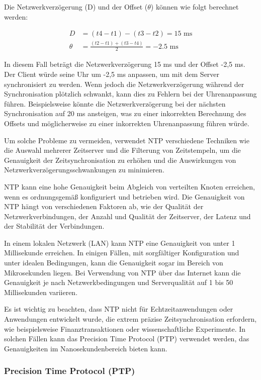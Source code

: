 Die Netzwerkverzögerung (D) und der Offset (\(\theta\)) können wie folgt berechnet werden:

\begin{align*}
D &= (t4 - t1) - (t3 - t2) = 15 \text{ ms} \\
\theta &= \frac{(t2 - t1) + (t3 - t4)}{2} = -2.5 \text{ ms}
\end{align*}

In diesem Fall beträgt die Netzwerkverzögerung 15 ms und der Offset -2,5 ms. Der Client würde seine Uhr um -2,5 ms anpassen, um mit dem Server synchronisiert zu werden. Wenn jedoch die Netzwerkverzögerung während der Synchronisation plötzlich schwankt, kann dies zu Fehlern bei der Uhrenanpassung führen. Beispielsweise könnte die Netzwerkverzögerung bei der nächsten Synchronisation auf 20 ms ansteigen, was zu einer inkorrekten Berechnung des Offsets und möglicherweise zu einer inkorrekten Uhrenanpassung führen würde.

Um solche Probleme zu vermeiden, verwendet NTP verschiedene Techniken wie die Auswahl mehrerer Zeitserver und die Filterung von Zeitstempeln, um die Genauigkeit der Zeitsynchronisation zu erhöhen und die Auswirkungen von Netzwerkverzögerungsschwankungen zu minimieren.

NTP kann eine hohe Genauigkeit beim Abgleich von verteilten Knoten erreichen, wenn es ordnungsgemäß konfiguriert und betrieben wird. Die Genauigkeit von NTP hängt von verschiedenen Faktoren ab, wie der Qualität der Netzwerkverbindungen, der Anzahl und Qualität der Zeitserver, der Latenz und der Stabilität der Verbindungen.

In einem lokalen Netzwerk (LAN) kann NTP eine Genauigkeit von unter 1 Millisekunde erreichen. In einigen Fällen, mit sorgfältiger Konfiguration und unter idealen Bedingungen, kann die Genauigkeit sogar im Bereich von Mikrosekunden liegen. Bei Verwendung von NTP über das Internet kann die Genauigkeit je nach Netzwerkbedingungen und Serverqualität auf 1 bis 50 Millisekunden variieren.

Es ist wichtig zu beachten, dass NTP nicht für Echtzeitanwendungen oder Anwendungen entwickelt wurde, die extrem präzise Zeitsynchronisation erfordern, wie beispielsweise Finanztransaktionen oder wissenschaftliche Experimente. In solchen Fällen kann das Precision Time Protocol (PTP) verwendet werden, das Genauigkeiten im Nanosekundenbereich bieten kann.

\subsubsection{Precision Time Protocol (PTP)}

